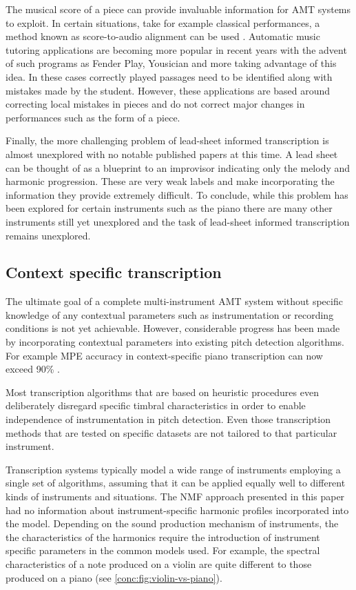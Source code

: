 The musical score of a piece can provide invaluable information for \ac{AMT} systems
to exploit. In certain situations, take for example classical performances, a
method known as score-to-audio alignment can be used \cite{Wang2017}. Automatic
music tutoring applications are becoming more popular in recent years with the
advent of such programs as Fender Play, Yousician and more taking advantage of
this idea. In these cases correctly played passages need to be identified
along with mistakes made by the student. However, these applications are based
around correcting local mistakes in pieces and do not correct major changes in
performances such as the form of a piece.

Finally, the more challenging problem of lead-sheet informed transcription is almost unexplored with no notable
published papers at this time. A lead sheet can be thought of as a blueprint to
an improvisor indicating only the melody and harmonic progression. These are
very weak labels and make incorporating the information they provide extremely
difficult. To conclude, while this problem has been explored for certain
instruments such as the piano there are many other instruments still yet
unexplored and the task of lead-sheet informed transcription remains unexplored.

\subsection{Context specific transcription}

The ultimate goal of a complete multi-instrument \ac{AMT} system without specific
knowledge of any contextual parameters such as instrumentation or recording
conditions is not yet achievable. However, considerable progress has been made
by incorporating contextual parameters into existing pitch detection algorithms.
For example \ac{MPE} accuracy in context-specific piano
transcription can now exceed 90\% \cite{context-dependent2016:Cogliati}.

Most transcription algorithms that are based on heuristic procedures even
deliberately disregard specific timbral characteristics in order to enable
independence of instrumentation in pitch detection. Even those transcription
methods that are tested on specific datasets are not tailored to that particular
instrument.

Transcription systems typically model a wide range of instruments employing a
single set of algorithms, assuming that it can be applied equally well to
different kinds of instruments and situations. The \ac{NMF} approach presented in
this paper had no information about instrument-specific harmonic profiles
incorporated into the model. Depending on the sound production mechanism of
instruments, the the characteristics of the harmonics require the introduction
of instrument specific parameters in the common models used. For example, the
spectral characteristics of a note produced on a violin are quite different to
those produced on a piano (see \autoref{conc:fig:violin-vs-piano}).

